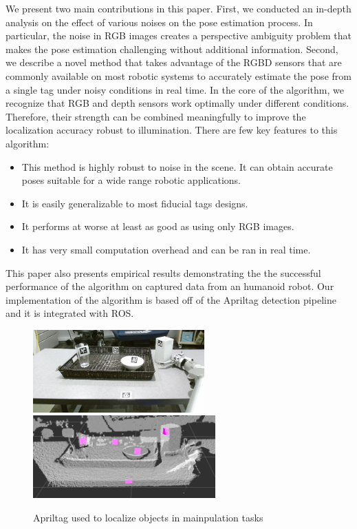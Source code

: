 We present two main contributions in this paper. First, we conducted an in-depth analysis on the effect of various noises on the pose estimation process. In particular, the noise in RGB images creates a perspective ambiguity problem that makes the pose estimation challenging without additional information. Second, we describe a novel method that takes advantage of the RGBD sensors that are commonly available on most robotic systems to accurately estimate the pose from a single tag under noisy conditions in real time. In the core of the algorithm, we recognize that RGB and depth sensors work optimally under different conditions. Therefore, their strength can be combined meaningfully to improve the localization accuracy robust to illumination. There are few key features to this algorithm: 
\begin{itemize}
\item This method is highly robust to noise in the scene. It can obtain accurate poses suitable for a wide range robotic applications.   
\item It is easily generalizable to most fiducial tags designs.
\item It performs at worse at least as good as using only RGB images.
\item It has very small computation overhead and can be ran in real time. 
\end{itemize}

This paper also presents empirical results demonstrating the the successful performance of the algorithm on captured data from an humanoid robot. Our implementation of the algorithm is based off of the Apriltag detection pipeline and it is integrated with ROS. 

\begin{figure}
\includegraphics[width=\columnwidth, height=120px]{figs/table_clearing_rgb_small} \\
\includegraphics[width=\columnwidth, height=120px]{figs/table_clearing_depth}
\label{fig:table_clearing}
\caption{Apriltag used to localize objects in mainpulation tasks}
\end{figure}